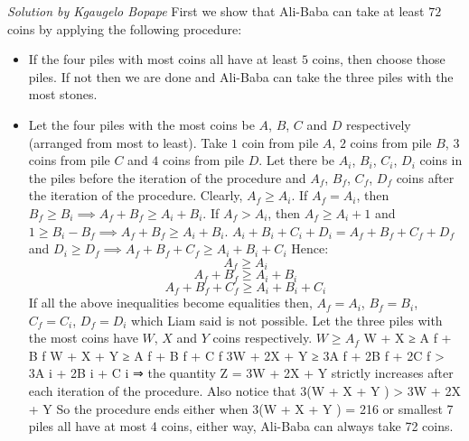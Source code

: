 \documentclass{article}
\begin{document}
\begin{enumerate}
\textit{Solution by Kgaugelo Bopape}
First we show that Ali-Baba can take at least $72$ coins by applying the following
procedure:
\begin{itemize}
	\item If the four piles with most coins all have at least $5$ coins, then choose those piles. If not then we are done and Ali-Baba can take the three piles with the most stones.
	\item Let the four piles with the most coins be $A$, $B$, $C$ and $D$ respectively (arranged from most to least).
	Take $1$ coin from pile $A$, $2$ coins from pile $B$, $3$ coins from pile $C$ and $4$ coins from pile $D$.
	Let there be $A_i$, $B_i$, $C_i$, $D_i$ coins in the piles before the iteration of the procedure and $A_f$, $B_f$, $C_f$, $D_f$ coins after the iteration of the procedure.
	Clearly, $A_f \ge A_i$.
	If $A_f = A_i$, then $B_f \ge B_i \implies A_f + B_f \ge A_i + B_i$.
	If $A_f > A_i$, then $A_f \ge A_i + 1$ and $1 \ge B_i − B_f \implies A_f + B_f \ge A_i + B_i$.
	$A_i + B_i + C_i + D_i = A_f + B_f + C_f + D_f$ and $D_i \ge D_f \implies A_f + B_f + C_f \ge
	A_i + B_i + C_i$
	Hence:
	$$A_f \ge A_i$$
	$$A_f + B_f \ge A_i + B_i$$
	$$A_f + B_f + C_f \ge A_i + B_i + C_i$$
	If all the above inequalities become equalities then, $A_f = A_i$, $B_f = B_i$, $C_f = C_i$, $D_f = D_i$ which Liam said is not possible.
	Let the three piles with the most coins have $W$, $X$ and $Y$ coins respectively.
	$W \ge A_f$
	W + X ≥ A f + B f
	W + X + Y ≥ A f + B f + C f
	3W + 2X + Y ≥ 3A f + 2B f + 2C f > 3A i + 2B i + C i
	⇒ the quantity Z = 3W + 2X + Y strictly increases after each iteration of
	the procedure. Also notice that 3(W + X + Y ) > 3W + 2X + Y
	So the procedure ends either when 3(W + X + Y ) = 216 or smallest 7 piles
	all have at most 4 coins, either way, Ali-Baba can always take 72 coins.
\end{itemize}


\end{enumerate}
\end{document}
